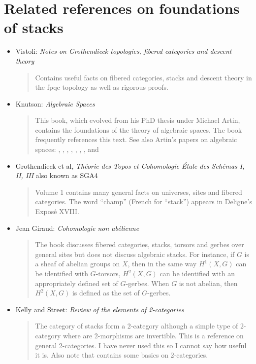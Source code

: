 \section{Related references on foundations of stacks}
\label{section-related}


\begin{itemize}
\item Vistoli:
\emph{Notes on Grothendieck topologies, fibered categories and descent theory}
\cite{vistoli_fga}
\begin{quote}
Contains useful facts on fibered categories, stacks and descent theory in the
fpqc topology as well as rigorous proofs.
\end{quote}
\item Knutson: \emph{Algebraic Spaces} \cite{Kn}
\begin{quote}
This book, which evolved from his PhD thesis under Michael Artin,
contains the foundations of the theory of algebraic spaces. The book
\cite{LM-B} frequently references this text. See also Artin's papers on
algebraic spaces: \cite{Artin-Algebraic-Approximation},
\cite{ArtinI}, \cite{Artin-Implicit-Function},
\cite{ArtinII}, \cite{Artin-Construction-Techniques},
\cite{Artin-Algebraic-Spaces}, \cite{Artin-Theorem-Representability}, and
\cite{ArtinVersal}
\end{quote}
\item Grothendieck et al, \emph{Th\'eorie des Topos et Cohomologie \'Etale des
Sch\'emas I, II, III} also known as SGA4 \cite{SGA4}
\begin{quote}
Volume 1 contains many general facts on universes, sites and fibered
categories. The word ``champ'' (French for ``stack'') appears in
Deligne's Expos\'e XVIII.
\end{quote}
\item Jean Giraud: \emph{Cohomologie non ab\'elienne} \cite{giraud}
\begin{quote}
The book discusses fibered categories, stacks, torsors and gerbes over general
sites but does not discuss algebraic stacks. For instance, if $G$ is a sheaf
of abelian groups on $X$, then in the same way $H^1(X, G)$ can be identified
with $G$-torsors, $H^2(X, G)$ can be identified with an appropriately defined
set of $G$-gerbes. When $G$ is not abelian, then $H^2(X, G)$ is defined as the
set of $G$-gerbes.
\end{quote}
\item Kelly and Street: \emph{Review of the elements of 2-categories}
\cite{kelly-street}
\begin{quote}
The category of stacks form a 2-category although a simple type of 2-category
where are 2-morphisms are invertible. This is a reference on general
2-categories. I have never used this so I cannot say how useful it is. Also
note that \cite{stacks-project} contains some basics on 2-categories.
\end{quote}
\end{itemize}




